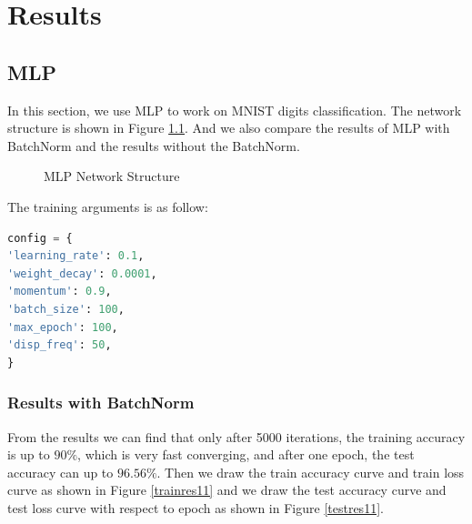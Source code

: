 \documentclass{elegantbook}
\begin{document}
\chapter{Results}

\section{MLP}
In this section, we use MLP to work on MNIST digits classification. The network structure is shown in Figure \ref{fig1}. And we also compare the results of MLP with BatchNorm and the results without the BatchNorm.
\begin{figure}[htbp]
	\centering
	\caption{\label{fig1}MLP Network Structure}
\end{figure}

The training arguments is as follow:

\begin{lstlisting}[frame=single,language=python]  
config = {
'learning_rate': 0.1,
'weight_decay': 0.0001,
'momentum': 0.9,
'batch_size': 100,
'max_epoch': 100,
'disp_freq': 50,
}
\end{lstlisting}

\subsection{Results with BatchNorm}
From the results we can find that only after 5000 iterations, the training accuracy is up to $90\%$, which is very fast converging, and after one epoch, the test accuracy can up to $96.56\%$. Then we draw the train accuracy curve and train loss curve as shown in Figure \ref{trainres11} and we draw the test accuracy curve and test loss curve with respect to epoch as shown in Figure \ref{testres11}.
\end{document}
